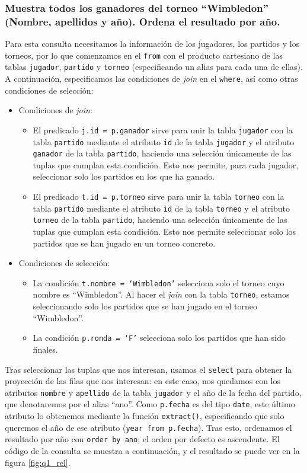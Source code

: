 \documentclass[11pt]{opticajnl}
\begin{document}
\subsubsection{Muestra todos los ganadores del torneo ``Wimbledon'' (Nombre, apellidos y año). Ordena el resultado por año.}

Para esta consulta necesitamos la información de los jugadores, los partidos y los torneos, por lo que comenzamos en el \texttt{from} con el producto cartesiano de las tablas \texttt{jugador}, \texttt{partido} y \texttt{torneo} (especificando un alias para cada una de ellas). A continuación, especificamos las condiciones de \textit{join} en el \texttt{where}, así como otras condiciones de selección: 
\begin{itemize}
\item Condiciones de \textit{join}:
\begin{itemize}
\item El predicado \texttt{j.id = p.ganador} sirve para unir la tabla \texttt{jugador} con la tabla \texttt{partido} mediante el atributo \texttt{id} de la tabla \texttt{jugador} y el atributo \texttt{ganador} de la tabla \texttt{partido}, haciendo una selección únicamente de las tuplas que cumplan esta condición. Esto nos permite, para cada jugador, seleccionar solo los partidos en los que ha ganado.
\item El predicado \texttt{t.id = p.torneo} sirve para unir la tabla \texttt{torneo} con la tabla \texttt{partido} mediante el atributo \texttt{id} de la tabla \texttt{torneo} y el atributo \texttt{torneo} de la tabla \texttt{partido}, haciendo una selección únicamente de las tuplas que cumplan esta condición. Esto nos permite seleccionar solo los partidos que se han jugado en un torneo concreto.
\end{itemize}
\item Condiciones de selección:
\begin{itemize}
\item La condición \texttt{t.nombre = `Wimbledon'} selecciona solo el torneo cuyo nombre es ``Wimbledon''. Al hacer el \textit{join} con la tabla \texttt{torneo}, estamos seleccionando solo los partidos que se han jugado en el torneo ``Wimbledon''.
\item La condición \texttt{p.ronda = `F'} selecciona solo los partidos que han sido finales.
\end{itemize}
\end{itemize}

Tras seleccionar las tuplas que nos interesan, usamos el \texttt{select} para obtener la proyección de las filas que nos interesan: en este caso, nos quedamos con los atributos \texttt{nombre} y \texttt{apellido} de la tabla \texttt{jugador} y el año de la fecha del partido, que denotaremos por el alias ``ano''. Como \texttt{p.fecha} es del tipo \texttt{date}, este último atributo lo obtenemos mediante la función \texttt{extract()}, especificando que solo queremos el año de ese atributo (\texttt{year from p.fecha}). Tras esto, ordenamos el resultado por año con \texttt{order by ano}; el orden por defecto es ascendente. El código de la consulta se muestra a continuación, y el resultado se puede ver en la figura \ref{fig:q1_rel}.
\end{document}
